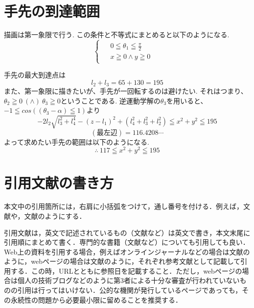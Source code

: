 \documentclass[10pt]{jarticle}
\begin{document}
	\section{手先の到達範囲}
	描画は第一象限で行う.
	この条件と不等式にまとめると以下のようになる.
	\begin{equation*}
		\left\{
			\begin{array}{c}
				\begin{split}
					&  0  \leqq  \theta_1  \leqq  \frac{\pi}{2}  &  \\
					&  x  \geqq  0  \land  y  \geqq  0
				\end{split}
			\end{array}
		\right.
	\end{equation*}

	手先の最大到達点は
	\begin{equation*}
		l_2+l_3  =  65+130  =  195
	\end{equation*}
	また、第一象限に描きたいが、手先が一回転するのは避けたい.
	それはつまり、$  \theta_2  \geqq  0\  (\land)  \  \theta_3  \geqq0$ということである.
	逆運動学解の$\theta_3$を用いると、$  -1  \leqq  cos((\theta_3  -  \alpha)  \leqq  1)$より
	\begin{equation*}
		-2l_2\sqrt{l_3^2+l_4^4}  - (z-l_1)^2  +  (l_4^2  +  l_3^2  +  l_2^2)  \leqq  x^2  +  y^2  \leqq  195
	\end{equation*}
	$$
		(\text{最左辺})  =  116.4208  \cdots
	$$
	よって求めたい手先の範囲は以下のようになる.
	\begin{equation*}
		\therefore\  117  \leqq  x^2  +  y^2  \leqq  195
	\end{equation*}



    
    \section{引用文献の書き方}%
    本文中の引用箇所には，右肩に小括弧をつけて，通し番号を付ける．例えば，文献\cite{工大2005}や，文献\cite{Shibutani2004, Handbook1979, Kikuchi2017, Adrobo2019}のようにする．
    
    引用文献は，英文で記述されているもの（文献\cite{Shibutani2004}など）は英文で書き，本文末尾に引用順にまとめて書く．専門的な書籍（文献\cite{Handbook1979}など）についても引用しても良い．
    Web上の資料を引用する場合，例えばオンラインジャーナルなどの場合は文献\cite{Kikuchi2017}のように，webページの場合は文献\cite{Adrobo2019}のように，それぞれ参考文献として記載して引用する．この時，URLとともに参照日を記載すること．ただし，webページの場合は個人の技術ブログなどのように第3者による十分な審査が行われていないものの引用は行ってはいけない．公的な機関が発行しているページであっても，その永続性の問題から必要最小限に留めることを推奨する．
        
\end{document}
